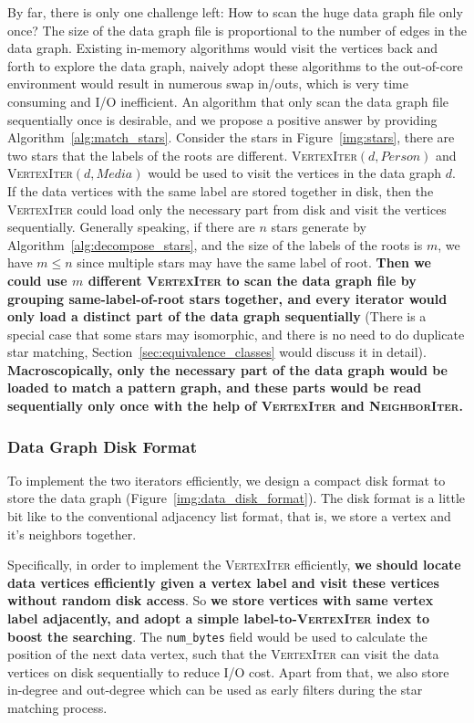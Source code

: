 By far, there is only one challenge left: How to scan the huge data graph file only once?
The size of the data graph file is proportional to the number of edges in the data graph.
Existing in-memory algorithms would visit the vertices back and forth to explore the data graph,
naively adopt these algorithms to the out-of-core environment would result in numerous swap in/outs,
which is very time consuming and I/O inefficient.
An algorithm that only scan the data graph file sequentially once is desirable,
and we propose a positive answer by providing Algorithm~\ref{alg:match_stars}.
Consider the stars in Figure~\ref{img:stars}, there are two stars that the labels of the roots are different.
\textsc{VertexIter}$(d, Person)$ and \textsc{VertexIter}$(d, Media)$ would be used to visit the vertices in the data graph $d$.
If the data vertices with the same label are stored together in disk,
then the \textsc{VertexIter} could load only the necessary part from disk and visit the vertices sequentially.
Generally speaking, if there are $n$ stars generate by Algorithm~\ref{alg:decompose_stars},
and the size of the labels of the roots is $m$, we have $m \le n$ since multiple stars may have the same label of root.
\textbf{Then we could use $m$ different \textsc{VertexIter} to scan the data graph file by grouping same-label-of-root stars together,
and every iterator would only load a distinct part of the data graph sequentially}
(There is a special case that some stars may isomorphic,
and there is no need to do duplicate star matching, Section~\ref{sec:equivalence_classes} would discuss it in detail).
\textbf{Macroscopically, only the necessary part of the data graph would be loaded to match a pattern graph,
and these parts would be read sequentially only once with the help of \textsc{VertexIter} and \textsc{NeighborIter}.}
\subsubsection*{Data Graph Disk Format}
To implement the two iterators efficiently, we design a compact disk format to store the data graph (Figure~\ref{img:data_disk_format}).
The disk format is a little bit like to the conventional adjacency list format,
that is, we store a vertex and it's neighbors together.

Specifically, in order to implement the \textsc{VertexIter} efficiently,
\textbf{we should locate data vertices efficiently given a vertex label and visit these vertices without random disk access}.
So \textbf{we store vertices with same vertex label adjacently, and adopt a simple label-to-\textsc{VertexIter} index to boost the searching}.
The \texttt{num_bytes} field would be used to calculate the position of the next data vertex,
such that the \textsc{VertexIter} can visit the data vertices on disk sequentially to reduce I/O cost.
Apart from that, we also store in-degree and out-degree which can be used as early filters during the star matching process.

